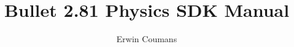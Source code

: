 \documentclass[openany]{book}
\begin{document}

	\title{\textbf{Bullet 2.81 Physics SDK Manual}}
	\author{Erwin Coumans}
	\maketitle

	\renewcommand{\cftchapdotsep}{\cftdotsep}
	\tableofcontents


	

	\clearpage
	\printindex
\end{document}

